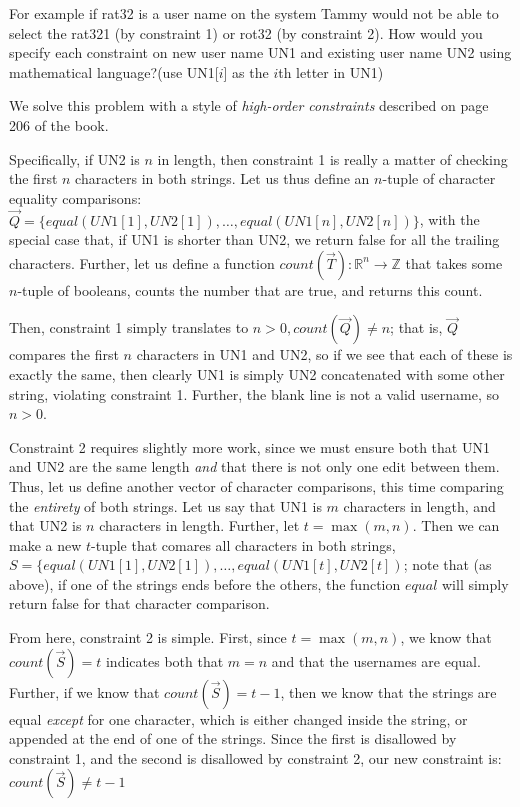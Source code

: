 \documentclass[12pt]{article}
\begin{document}
\noindent
For example if rat32 is a user name on the system Tammy would not be
able to select the rat321 (by constraint 1) or rot32 (by constraint 2).
How would you specify each constraint on new user name UN1 and existing user name UN2 using mathematical language?(use UN1[$i$] as the $i$th letter in UN1)

\begin{solution}
We solve this problem with a style of \textit{high-order constraints} described on page 206 of the book. \newline

Specifically, if UN2 is $n$ in length, then constraint 1 is really a matter of checking the first $n$ characters in both strings. Let us thus define an $n$-tuple of character equality comparisons: $\vec{Q} = \{equal(UN1[1], UN2[1]), \ldots, equal(UN1[n], UN2[n]) \}$, with the special case that, if UN1 is shorter than UN2, we return false for all the trailing characters. Further, let us define a function $count(\vec{T}) : \mathbb{R}^n \rightarrow \mathbb{Z}$ that takes some $n$-tuple of booleans, counts the number that are true, and returns this count. \newline

Then, constraint 1 simply translates to $n > 0, count(\vec{Q}) \neq n$; that is, $\vec{Q}$ compares the first $n$ characters in UN1 and UN2, so if we see that each of these is exactly the same, then clearly UN1 is simply UN2 concatenated with some other string, violating constraint 1. Further, the blank line is not a valid username, so $n > 0$. \newline

Constraint 2 requires slightly more work, since we must ensure both that UN1 and UN2 are the same length \textit{and} that there is not only one edit between them. Thus, let us define another vector of character comparisons, this time comparing the \textit{entirety} of both strings. Let us say that UN1 is $m$ characters in length, and that UN2 is $n$ characters in length. Further, let $t = \max(m,n)$. Then we can make a new $t$-tuple that comares all characters in both strings, $S = \{ equal(UN1[1], UN2[1]), \ldots, equal(UN1[t], UN2[t])$; note that (as above), if one of the strings ends before the others, the function $equal$ will simply return false for that character comparison. \newline

From here, constraint 2 is simple. First, since $t = \max(m,n)$, we know that $count(\vec{S}) = t$ indicates both that $m = n$ and that the usernames are equal. Further, if we know that $count(\vec{S}) = t-1$, then we know that the strings are equal \textit{except} for one character, which is either changed inside the string, or appended at the end of one of the strings. Since the first is disallowed by constraint 1, and the second is disallowed by constraint 2, our new constraint is: $count(\vec{S}) \neq t-1$
\end{solution}
\end{document}
